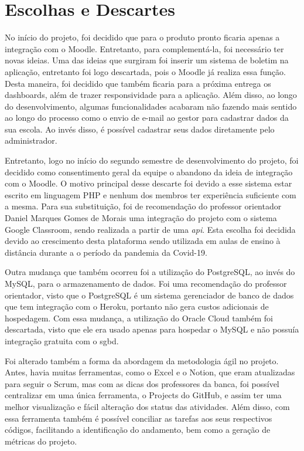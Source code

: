\section{Escolhas e Descartes}
No início do projeto, foi decidido que para o produto pronto ficaria apenas a integração com o Moodle. Entretanto, para complementá-la, foi necessário ter novas ideias. Uma das ideias que surgiram foi inserir um sistema de boletim na aplicação, entretanto foi logo descartada, pois o Moodle já realiza essa função. Desta maneira, foi decidido que também ficaria para a próxima entrega os \glspl{dashboard}, além de trazer responsividade para a aplicação. Além disso, ao longo do desenvolvimento, algumas funcionalidades acabaram não fazendo mais sentido ao longo do processo como o envio de e-mail ao gestor para cadastrar dados da sua escola. Ao invés disso, é possível cadastrar seus dados diretamente pelo administrador.

Entretanto, logo no início do segundo semestre de desenvolvimento do projeto, foi decidido como consentimento geral da equipe o abandono da ideia de integração com o Moodle. O motivo principal desse descarte foi devido a esse sistema estar escrito em linguagem PHP e nenhum dos membros ter experiência suficiente com a mesma. Para sua substituição, foi de recomendação do professor orientador Daniel Marques Gomes de Morais uma integração do projeto com o sistema Google Classroom, sendo realizada a partir de uma \textit{\ac{api}}. Esta escolha foi decidida devido ao crescimento desta plataforma sendo utilizada em aulas de ensino à distância durante a o período da pandemia da Covid-19.

Outra mudança que também ocorreu foi a utilização do PostgreSQL, ao invés do MySQL, para o armazenamento de dados. Foi uma recomendação do professor orientador, visto que o PostgreSQL é um sistema gerenciador de banco de dados que tem integração com o Heroku, portanto não gera custos adicionais de hospedagem. Com essa mudança, a utilização do Oracle Cloud também foi descartada, visto que ele era usado apenas para hospedar o MySQL e não possuía integração gratuita com o \ac{sgbd}.

Foi alterado também a forma da abordagem da metodologia ágil no projeto. Antes, havia muitas ferramentas, como o Excel e o Notion, que eram atualizadas para seguir o Scrum, mas com as dicas dos professores da banca, foi possível centralizar em uma única ferramenta, o Projects do GitHub, e assim ter uma melhor visualização e fácil alteração dos status das atividades. Além disso, com essa ferramenta também é possível conciliar as tarefas aos seus respectivos códigos, facilitando a identificação do andamento, bem como a geração de métricas do projeto.